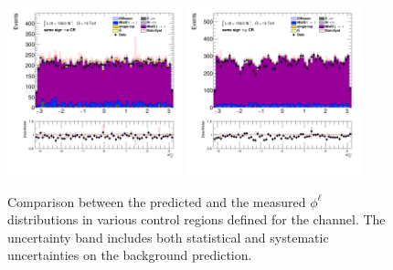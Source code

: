 \begin{figure}[!htp]
\begin{center}
			\includegraphics[width=0.45\textwidth]{chapters/chapter6_HPlus/images/taulep/lep_0_phi_SS_TAUEL.png} 
			\includegraphics[width=0.45\textwidth]{chapters/chapter6_HPlus/images/taulep/lep_0_phi_SS_TAUMU.png} \\
			\end{center}
			\caption{
			Comparison between the predicted and the measured $\phi^{\ell}$ distributions in various control regions defined for the \taulep channel. The uncertainty band includes both statistical and systematic uncertainties on the background prediction. 
			}
			\label{fig:bkg-phi-lep-taulep}
		\end{figure}


